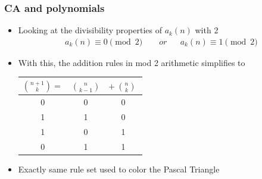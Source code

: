 \documentclass{beamer}
\begin{document}
\begin{frame}
    \frametitle{CA and polynomials}
    \begin{itemize}
        \item Looking at the divisibility properties of $a_k(n)$ with 2
        \begin{align*}
            a_k(n) \equiv 0 \pmod 2  \qquad or&& a_k(n) \equiv 1 \pmod 2
        \end{align*}
        \item With this, the addition rules in mod 2 arithmetic simplifies to
        \begin{table}
            \centering
            \begin{tabular}{|ccc|}
                \hline
                $\binom{n+1}{k} =$ & $\binom{n}{k-1}$& $+ \ \binom{n}{k} \ $\\
                \hline
                0 & 0 & 0 \\
                1 & 1 & 0 \\
                1 & 0 & 1 \\
                0 & 1 & 1 \\
                \hline
            \end{tabular}
        \end{table}
        \item Exactly same rule set used to color the Pascal Triangle
    \end{itemize}
\end{frame}
\end{document}
